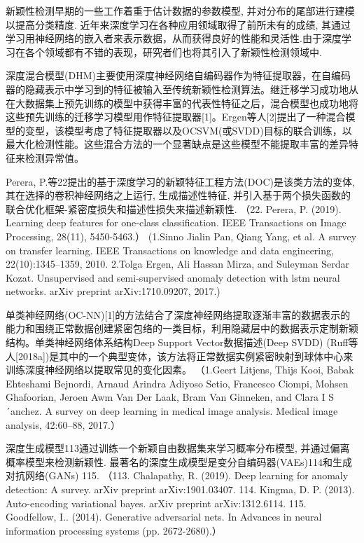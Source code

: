 \documentclass{Style/aas}
\begin{document}
\begin{multicols}{2}
  新颖性检测早期的一些工作着重于估计数据的参数模型, 并对分布的尾部进行建模以提高分类精度. 近年来深度学习在各种应用领域取得了前所未有的成绩, 其通过学习用神经网络的嵌入者来表示数据，从而获得良好的性能和灵活性.由于深度学习在各个领域都有不错的表现，研究者们也将其引入了新颖性检测领域中.

  深度混合模型(DHM)主要使用深度神经网络自编码器作为特征提取器，在自编码器的隐藏表示中学习到的特征被输入至传统新颖性检测算法。继迁移学习成功地从在大数据集上预先训练的模型中获得丰富的代表性特征之后，混合模型也成功地将这些预先训练的迁移学习模型用作特征提取器[1]。Ergen等人[2]提出了一种混合模型的变型，该模型考虑了特征提取器以及OCSVM(或SVDD)目标的联合训练，以最大化检测性能。这些混合方法的一个显著缺点是这些模型不能提取丰富的差异特征来检测异常值。

  Perera, P.等22提出的基于深度学习的新颖特征工程方法(DOC)是该类方法的变体, 其在选择的卷积神经网络之上运行, 生成描述性特征, 并引入基于两个损失函数的联合优化框架-紧密度损失和描述性损失来描述新颖性. （22.	Perera, P. (2019). Learning deep features for one-class classification. IEEE Transactions on Image Processing, 28(11), 5450-5463.）
  (1.Sinno Jialin Pan, Qiang Yang, et al. A survey on transfer learning. IEEE Transactions on knowledge and data engineering, 22(10):1345–1359, 2010.
  2.Tolga Ergen, Ali Hassan Mirza, and Suleyman Serdar Kozat. Unsupervised and semi-supervised anomaly detection with lstm neural networks. arXiv preprint arXiv:1710.09207, 2017.)

  单类神经网络(OC-NN)[1]的方法结合了深度神经网络提取逐渐丰富的数据表示的能力和围绕正常数据创建紧密包络的一类目标，利用隐藏层中的数据表示定制新颖结构。单类神经网络体系结构Deep Support Vector数据描述(Deep SVDD) (Ruff等人[2018a])是其中的一个典型变体，该方法将正常数据实例紧密映射到球体中心来训练深度神经网络以提取常见的变化因素。
  （1.Geert Litjens, Thijs Kooi, Babak Ehteshami Bejnordi, Arnaud Arindra Adiyoso Setio, Francesco Ciompi, Mohsen Ghafoorian, Jeroen Awm Van Der Laak, Bram Van Ginneken, and Clara I S´anchez. A survey on deep learning in medical image analysis. Medical image analysis, 42:60–88, 2017.）

  深度生成模型113通过训练一个新颖自由数据集来学习概率分布模型, 并通过偏离概率模型来检测新颖性. 最著名的深度生成模型是变分自编码器(VAEs)114和生成对抗网络(GANs) 115.
  （113. Chalapathy, R. (2019). Deep learning for anomaly detection: A survey. arXiv preprint arXiv:1901.03407.
  114.	Kingma, D. P. (2013). Auto-encoding variational bayes. arXiv preprint arXiv:1312.6114.
  115.	Goodfellow, I.. (2014). Generative adversarial nets. In Advances in neural information processing systems (pp. 2672-2680).）



\end{multicols}
\end{document}
